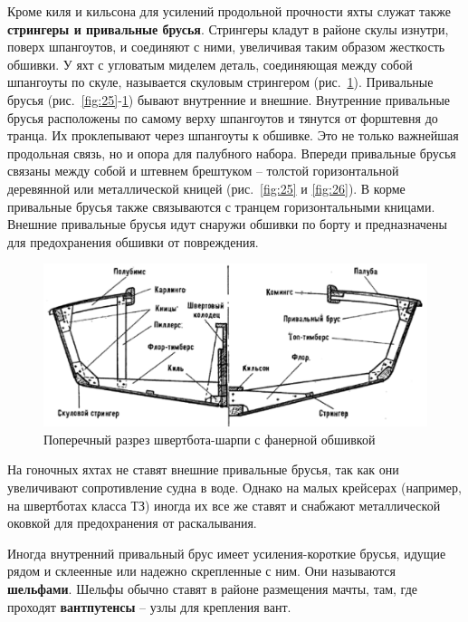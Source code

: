 \documentclass[a4paper, 12pt, twoside, final]{scrbook}
\begin{document}
Кроме киля и кильсона для усилений продольной прочности яхты служат
также \textbf{стрингеры и привальные брусья}. Стрингеры кладут в районе
скулы изнутри, поверх шпангоутов, и соединяют с ними, увеличивая таким
образом жесткость обшивки. У яхт с угловатым миделем деталь, соединяющая
между собой шпангоуты по скуле, называется скуловым стрингером (рис.~\ref{fig:28}).
Привальные брусья (рис.~\ref{fig:25}\--\ref{fig:28})
бывают внутренние и внешние. Внутренние привальные брусья расположены
по самому верху шпангоутов и тянутся от форштевня до транца. Их проклепывают
через шпангоуты к обшивке. Это не только важнейшая продольная связь,
но и опора для палубного набора. Впереди привальные брусья связаны
между собой и штевнем брештуком \--- толстой горизонтальной деревянной
или металлической кницей (рис.~\ref{fig:25}
и \ref{fig:26}).
В корме привальные брусья также связываются с транцем горизонтальными
кницами. Внешние привальные брусья идут снаружи обшивки по борту и
предназначены для предохранения обшивки от повреждения.

\begin{figure}[htbp]
\begin{centering}
\includegraphics{Razrez_2}
\par\end{centering}

\protect\caption{\label{fig:28}Поперечный
разрез швертбота-шарпи с фанерной обшивкой}


\end{figure}


На гоночных яхтах не ставят внешние привальные брусья, так как они
увеличивают сопротивление судна в воде. Однако на малых крейсерах
(например, на швертботах класса ТЗ) иногда их все же ставят и снабжают
металлической оковкой для предохранения от раскалывания.

Иногда внутренний привальный брус имеет усиления-короткие брусья,
идущие рядом и склеенные или надежно скрепленные с ним. Они называются
\textbf{шельфами}. Шельфы обычно ставят в районе размещения мачты,
там, где проходят \textbf{вантпутенсы} \--- узлы для крепления вант.
\end{document}
